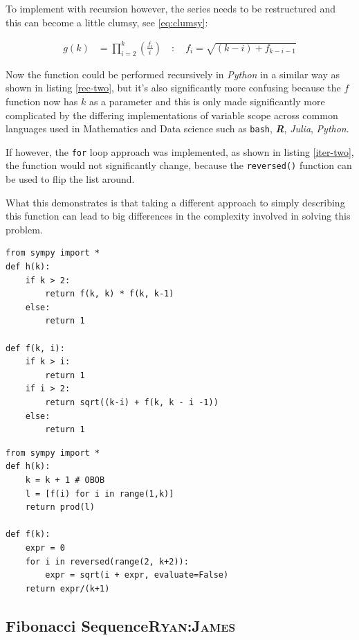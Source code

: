 \documentclass[11pt]{article}
\begin{document}
To implement with recursion however, the series needs to be restructured and
this can become a little clumsy, see \eqref{eq:clumsy}:

\begin{align}
    g\left( k \right) &=  \prod^k_{i = 2} \left( \frac{f_i}{i}  \right) \quad : \quad f_{i} = \sqrt{\left( k- i \right)  +  f_{k - i - 1}} \label{eq:clumsy}
\end{align}

Now the function could be performed recursively in \emph{Python} in a similar way as
shown in listing \ref{rec-two}, but it's also significantly more confusing because the
\(f\) function now has \(k\) as a parameter and this is only made significantly more
complicated by the differing implementations of variable scope across common
languages used in Mathematics and Data science such as \texttt{bash}, \textbf{\emph{R}}, \emph{Julia}, \emph{Python}.

If however, the \texttt{for} loop approach was implemented, as shown in listing
\ref{iter-two}, the function would not significantly change, because the \texttt{reversed()} function can be
used to flip the list around.

What this demonstrates is that taking a different approach to simply describing
this function can lead to big differences in the complexity involved in solving
this problem.

\begin{lstlisting}
from sympy import *
def h(k):
    if k > 2:
        return f(k, k) * f(k, k-1)
    else:
        return 1

def f(k, i):
    if k > i:
        return 1
    if i > 2:
        return sqrt((k-i) + f(k, k - i -1))
    else:
        return 1
\end{lstlisting}


\begin{lstlisting}
from sympy import *
def h(k):
    k = k + 1 # OBOB
    l = [f(i) for i in range(1,k)]
    return prod(l)

def f(k):
    expr = 0
    for i in reversed(range(2, k+2)):
        expr = sqrt(i + expr, evaluate=False)
    return expr/(k+1)
\end{lstlisting}

\subsection{Fibonacci Sequence\hfill{}\textsc{Ryan:James}}
\label{sec:orgfa812b9}
\end{document}
